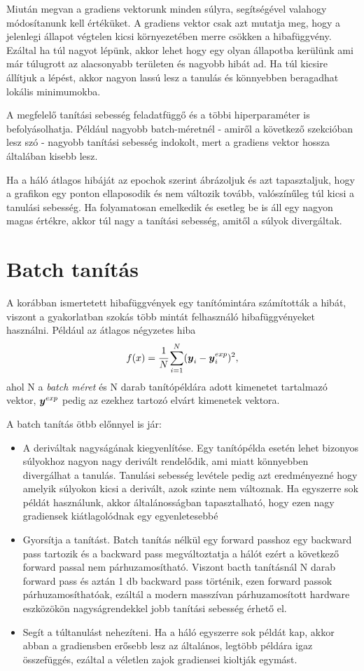 Miután megvan a gradiens vektorunk minden súlyra, segítségével valahogy módosítanunk kell értéküket. A gradiens vektor csak azt mutatja meg, hogy a jelenlegi állapot végtelen kicsi környezetében merre csökken a hibafüggvény. Ezáltal ha túl nagyot lépünk, akkor lehet hogy egy olyan állapotba kerülünk ami már túlugrott az alacsonyabb területen és nagyobb hibát ad. Ha túl kicsire állítjuk a lépést, akkor nagyon lassú lesz a tanulás és könnyebben beragadhat lokális minimumokba.

A megfelelő tanítási sebesség feladatfüggő és a többi hiperparaméter is befolyásolhatja. Például nagyobb batch-méretnél - amiről a következő szekcióban lesz szó - nagyobb tanítási sebesség indokolt, mert a gradiens vektor hossza általában kisebb lesz. 

Ha a háló átlagos hibáját az epochok szerint ábrázoljuk és azt tapasztaljuk, hogy a grafikon egy ponton ellaposodik és nem változik tovább, valószínűleg túl kicsi a tanulási sebesség. Ha folyamatosan emelkedik és esetleg be is áll egy nagyon magas értékre, akkor túl nagy a tanítási sebesség, amitől a súlyok divergáltak.  

\section{Batch tanítás}

A korábban ismertetett hibafüggvények egy tanítómintára számították a hibát, viszont a gyakorlatban szokás több mintát felhasználó hibafüggvényeket használni. Például az átlagos négyzetes hiba
\begin{equation}
    f(x) = \cfrac{1}{N}\sum^{N}_{i=1} (\boldsymbol y_i-\boldsymbol y^{exp}_i)^2,
\end{equation}
ahol N a \emph{batch méret} és \y N darab tanítópéldára adott kimenetet tartalmazó vektor, $\boldsymbol y^{exp}$ pedig az ezekhez tartozó elvárt kimenetek vektora.

A batch tanítás ötbb előnnyel is jár:
\begin{itemize}
    \item A deriváltak nagyságának kiegyenlítése. Egy tanítópélda esetén lehet bizonyos súlyokhoz nagyon nagy derivált rendelődik, ami miatt könnyebben divergálhat a tanulás. Tanulási sebesség levétele pedig azt eredményezné hogy amelyik súlyokon kicsi a derivált, azok szinte nem változnak. Ha egyszerre sok példát használunk, akkor általánosságban tapasztalható, hogy ezen nagy gradiensek kiátlagolódnak egy egyenletesebbé
    \item Gyorsítja a tanítást. Batch tanítás nélkül egy forward passhoz egy backward pass tartozik és a backward pass megváltoztatja a hálót ezért a következő forward passal nem párhuzamosítható. Viszont bacth tanításnál N darab forward pass és aztán 1 db backward pass történik, ezen forward passok párhuzamosíthatóak, ezáltál a modern masszívan párhuzamosított hardware eszközökön nagyságrendekkel jobb tanítási sebesség érhető el.
    \item Segít a túltanulást nehezíteni. Ha a háló egyszerre sok példát kap, akkor abban a gradiensben erősebb lesz az általános, legtöbb példára igaz összefüggés, ezáltal a véletlen zajok gradiensei kioltják egymást. 
\end{itemize}

